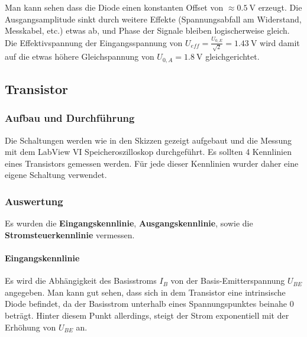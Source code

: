 \documentclass[12pt,twoside,a4paper]{scrartcl}
\begin{document}
			Man kann sehen dass die Diode einen konstanten Offset von $\approx \SI{0.5}{\volt}$ erzeugt. Die Ausgangsamplitude sinkt durch weitere Effekte (Spannungsabfall am Widerstand, Messkabel, etc.) etwas ab, und Phase der Signale bleiben logischerweise gleich. Die Effektivspannung der Eingangsspannung von $U_{eff} = \frac{U_{0,E}}{\sqrt{2}} = \SI{1.43}{\volt}$ wird damit auf die etwas höhere Gleichspannung von $  U_{0,A} = \SI{1.8}{\volt}$ gleichgerichtet.


	\subsection{Transistor}
		\subsubsection{Aufbau und Durchführung}
			Die Schaltungen werden wie in den Skizzen gezeigt aufgebaut und die Messung mit dem LabView VI Speicheroszilloskop durchgeführt.
      Es sollten 4 Kennlinien eines Transistors gemessen werden. Für jede dieser Kennlinien wurder daher eine eigene Schaltung verwendet.

		\subsubsection{Auswertung}

        Es wurden die \textbf{Eingangskennlinie}, \textbf{Ausgangskennlinie}, sowie die \textbf{Stromsteuerkennlinie} vermessen.

        \paragraph{Eingangskennlinie}

					Es wird die Abhängigkeit des Basisstroms $I_B$ von der Basis-Emitterspannung $U_{BE}$ angegeben. Man kann gut sehen, dass sich in dem Transistor eine intrinsische Diode befindet, da der Basisstrom unterhalb eines Spannungspunktes beinahe $0$ beträgt. Hinter diesem Punkt allerdings, steigt der Strom exponentiell mit der Erhöhung von $U_{BE}$ an.
\end{document}

